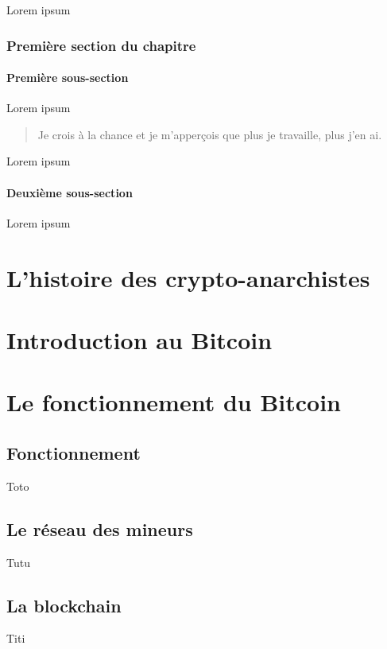 \documentclass{bredele} %
\begin{document}
    Lorem ipsum

    \section{Première section du chapitre}

    \subsection{Première sous-section}

    Lorem ipsum

    \begin{quote}
        Je crois à la chance et je m'apperçois que plus je travaille, plus j'en ai.
    \end{quote}

    Lorem ipsum

    \subsection{Deuxième sous-section}

    Lorem ipsum

    \part[L'histoire du digital et des crypyo-anarchiste]{L'histoire des crypto-anarchistes}

    \part[Les cypto-monnaie \& le Bitcoin]{Introduction au Bitcoin}

    \part[Le fonctionnement du Bitcoin]{Le fonctionnement du Bitcoin}
    \chapter[Fonctionnement]{Fonctionnement}
    Toto
    \chapter[Le réseau des mineurs]{Le réseau des mineurs}
    Tutu
    \chapter[Le blockchain]{La blockchain}
    Titi
\end{document}
